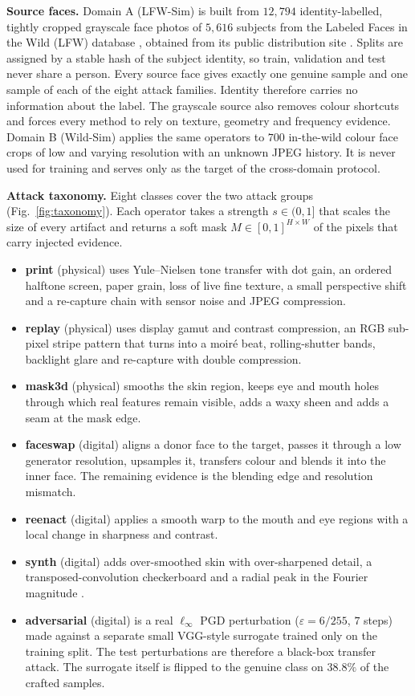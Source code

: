 \documentclass[conference]{IEEEtran}
\begin{document}
\textbf{Source faces.} Domain A (LFW-Sim) is built from $12{,}794$ identity-labelled,
tightly cropped grayscale face photos of $5{,}616$ subjects from the Labeled Faces in
the Wild (LFW) database \cite{huang2007lfw}, obtained from its public distribution
site \cite{lfwweb}. Splits are assigned by a stable hash of the subject identity, so
train, validation and test never share a person. Every source face gives exactly one
genuine sample and one sample of each of the eight attack families. Identity therefore
carries no information about the label. The grayscale source also removes colour
shortcuts and forces every method to rely on texture, geometry and frequency evidence.
Domain B (Wild-Sim) applies the same operators to $700$ in-the-wild colour face crops
of low and varying resolution with an unknown JPEG history. It is never used for
training and serves only as the target of the cross-domain protocol.

\textbf{Attack taxonomy.} Eight classes cover the two attack groups
(Fig.~\ref{fig:taxonomy}). Each operator takes a strength $s\in(0,1]$ that scales the
size of every artifact and returns a soft mask $M\in[0,1]^{H\times W}$ of the pixels
that carry injected evidence.
\begin{itemize}
\item \textbf{print} (physical) uses Yule--Nielsen tone transfer with dot gain, an
      ordered halftone screen, paper grain, loss of live fine texture, a small
      perspective shift and a re-capture chain with sensor noise and JPEG compression.
\item \textbf{replay} (physical) uses display gamut and contrast compression, an RGB
      sub-pixel stripe pattern that turns into a moir\'e beat, rolling-shutter bands,
      backlight glare and re-capture with double compression.
\item \textbf{mask3d} (physical) smooths the skin region, keeps eye and mouth holes
      through which real features remain visible, adds a waxy sheen and adds a seam at
      the mask edge.
\item \textbf{faceswap} (digital) aligns a donor face to the target, passes it through
      a low generator resolution, upsamples it, transfers colour and blends it into the
      inner face. The remaining evidence is the blending edge and resolution mismatch.
\item \textbf{reenact} (digital) applies a smooth warp to the mouth and eye regions
      with a local change in sharpness and contrast.
\item \textbf{synth} (digital) adds over-smoothed skin with over-sharpened detail, a
      transposed-convolution checkerboard \cite{odena2016checkerboard} and a radial
      peak in the Fourier magnitude \cite{frank2020frequency}.
\item \textbf{adversarial} (digital) is a real $\ell_\infty$ PGD perturbation
      ($\varepsilon=6/255$, $7$ steps) \cite{madry2018pgd} made against a separate
      small VGG-style surrogate trained only on the training split. The test
      perturbations are therefore a black-box transfer attack. The surrogate itself is
      flipped to the genuine class on $38.8\%$ of the crafted samples.
\end{itemize}
\end{document}
